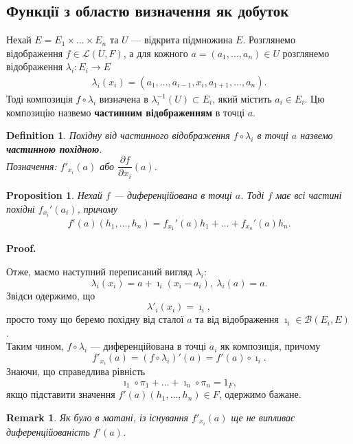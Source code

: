 \documentclass[a4paper, 10pt]{article}
\makeatletter
\theoremstyle{theoremdd}
\theoremstyle{theoremdd}
\newtheorem{definition}[theorem]{Definition}
\theoremstyle{theoremdd}
\theoremstyle{theoremdd}
\theoremstyle{theoremdd}
\newtheorem{proposition}[theorem]{Proposition}
\theoremstyle{theoremdd}
\newtheorem{remark}[theorem]{Remark}
\theoremstyle{theoremdd}
\theoremstyle{theoremdd}
\renewenvironment{proof}[1][Proof.\\]{\par
\pushQED{\hfill \qed}%
\normalfont \topsep6\p@\@plus6\p@\relax
\trivlist
\item\relax
{\bfseries
#1\@addpunct{.}}\hspace\labelsep\ignorespaces
}{%
\popQED\endtrivlist\@endpefalse
}
\makeatother
\begin{document}
\subsection{Функції з областю визначення як добуток}
Нехай $E = E_1 \times \dots \times E_n$ та $U$ --- відкрита підмножина $E$. Розглянемо відображення $f \in \mathcal{L}(U,F)$, а для кожного $a = (a_1,\dots,a_n) \in U$ розглянемо відображення $\lambda_i \colon E_i \to E$
\begin{align*}
\lambda_i(x_i) = (a_1,\dots,a_{i-1},x_i,a_{1+1},\dots,a_n).
\end{align*}
Тоді композиція $f \circ \lambda_i$ визначена в $\lambda_i^{-1}(U) \subset E_i$, який містить $a_i \in E_i$. Цю композицію назвемо \textbf{частинним відображенням} в точці $a$.

\begin{definition}
Похідну від частинного відображення $f \circ \lambda_i$ в точці $a$ назвемо \textbf{частинною похідною}.\\
Позначення: $f'_{x_i}(a)$ або $\dfrac{\partial f}{\partial x_i}(a)$. 
\end{definition}

\begin{proposition}
Нехай $f$ --- диференційована в точці $a$. Тоді $f$ має всі частині похідні $f_{x_i}'(a_i)$, причому
\begin{align*}
f'(a) (h_1,\dots,h_n) = f_{x_1}'(a)h_1 + \dots + f_{x_n}'(a)h_n.
\end{align*}
\end{proposition}

\begin{proof}
Отже, маємо наступний переписаний вигляд $\lambda_i$:
\[
\lambda_i(x_i) = a + \imath_i(x_i-a_i),\ \lambda_i(a) = a.
\]
Звідси одержимо, що
\[
\lambda'_i(x_i) = \imath_i,
\]
просто тому що беремо похідну від сталої $a$ та від відображення $\imath_i \in \mathcal{B}(E_i,E)$.\\
Таким чином, $f \circ \lambda_i$ --- диференційована в точці $a_i$ як композиція, причому
\[
f'_{x_i}(a) = (f \circ \lambda_i)'(a) = f'(a) \circ \imath_i.
\]
Знаючи, що справедлива рівність
\[
\imath_1 \circ \pi_1 + \dots + \imath_n \circ \pi_n = 1_F,
\]
якщо підставити значення $f'(a)(h_1,\dots,h_n) \in F$, одержимо бажане. 
\end{proof}

\begin{remark}
Як було в матані, із існування $f'_{x_i}(a)$ ще не випливає диференційованість $f'(a)$.
\end{remark}
\end{document}
